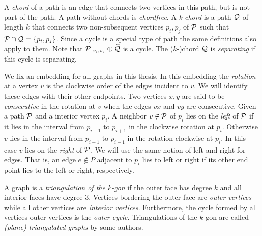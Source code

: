   A \emph{chord} of a path is an edge that connects two vertices in this path, but is not part of the path. A path without chords is \emph{chordfree}.
  A \emph{k-chord} is a path $\Q$ of length $k$ that connects two non-subsequent vertices $p_i, p_j$ of $\P$ such that $\P \cap \Q = \braces{p_i, p_j}$.
  Since a cycle is a special type of path the same definitions also apply to them.
  Note that $\P|_{v_i, v_j} \oplus \rev{\Q}$ is a cycle. The ($k$-)chord $\Q$ is \emph{separating} if this cycle is separating.

  We fix an embedding for all graphs in this thesis. In this embedding the \emph{rotation} at a vertex $v$ is the clockwise order of the edges incident to $v$. We will identify these edges with their other endpoints.
  Two vertices $x, y$ are said to be \emph{consecutive} in the rotation at $v$ when the edges $vx$ and $vy$ are consecutive.
  Given a path $\P$ and a interior vertex $p_i$. A neighbor $v \nin \P$ of $p_i$ lies on the \emph{left} of $\P$ if it lies in the interval from $p_{i-1}$ to $p_{i+1}$ in the clockwise rotation at $p_{i}$. Otherwise $v$ lies in the interval from $p_{i+1}$ to $p_{i-1}$ in the rotation clockwise at $p_i$. In this case $v$ lies on the \emph{right} of $\P$.
  We will use the same notion of left and right for edges. That is, an edge $e\nin P$ adjacent to $p_i$ lies to left or right if its other end point lies to the left or right, respectively.

  A graph is a \emph{triangulation of the $k$-gon} if the outer face has degree $k$ and all interior faces have degree $3$.
  Vertices bordering the outer face are \emph{outer vertices} while all other vertices are \emph{interior vertices}. Furthermore, the cycle formed by all vertices outer vertices is the \emph{outer cycle}.
  Triangulations of the $k$-gon are called \emph{(plane) triangulated graphs} by some authors.
